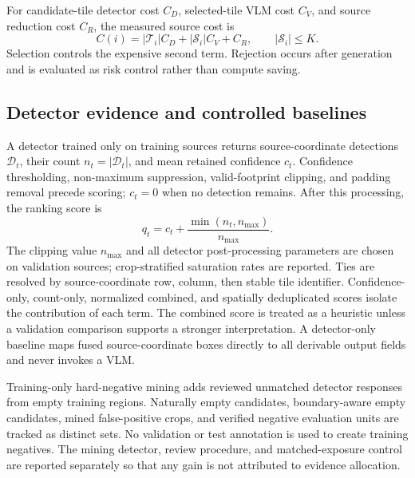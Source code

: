 For candidate-tile detector cost $C_D$, selected-tile VLM cost $C_V$, and source reduction cost $C_R$, the measured source cost is
\begin{equation}
C(i)=|\mathcal{T}_i|C_D+|\mathcal{S}_i|C_V+C_R,
\qquad |\mathcal{S}_i|\leq K.
\label{eq:cost}
\end{equation}
Selection controls the expensive second term. Rejection occurs after generation and is evaluated as risk control rather than compute saving.

\subsection{Detector evidence and controlled baselines}
A detector trained only on training sources returns source-coordinate detections $\mathcal{D}_t$, their count $n_t=|\mathcal{D}_t|$, and mean retained confidence $c_t$. Confidence thresholding, non-maximum suppression, valid-footprint clipping, and padding removal precede scoring; $c_t=0$ when no detection remains. After this processing, the ranking score is
\begin{equation}
q_t=c_t+\frac{\min(n_t,n_{\max})}{n_{\max}}.
\label{eq:evidence}
\end{equation}
The clipping value $n_{\max}$ and all detector post-processing parameters are chosen on validation sources; crop-stratified saturation rates are reported. Ties are resolved by source-coordinate row, column, then stable tile identifier. Confidence-only, count-only, normalized combined, and spatially deduplicated scores isolate the contribution of each term. The combined score is treated as a heuristic unless a validation comparison supports a stronger interpretation. A detector-only baseline maps fused source-coordinate boxes directly to all derivable output fields and never invokes a VLM.

Training-only hard-negative mining adds reviewed unmatched detector responses from empty training regions. Naturally empty candidates, boundary-aware empty candidates, mined false-positive crops, and verified negative evaluation units are tracked as distinct sets. No validation or test annotation is used to create training negatives. The mining detector, review procedure, and matched-exposure control are reported separately so that any gain is not attributed to evidence allocation.

